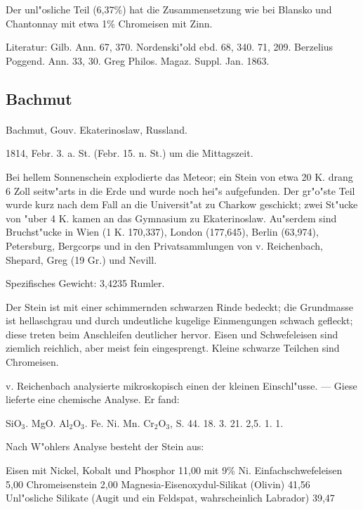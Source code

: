 \documentclass[a4paper, 11pt, oneside]{article}
\begin{document}
Der unl"osliche Teil (6,37\%) hat die Zusammensetzung wie bei Blansko und Chantonnay mit etwa 1\% Chromeisen mit Zinn.

Literatur: Gilb. Ann. 67, 370. Nordenski"old ebd. 68, 340. 71, 209. Berzelius Poggend. Ann. 33, 30. Greg Philos. Magaz. Suppl. Jan. 1863.

\subsection{Bachmut}
\normalsize
\paragraph{}
Bachmut, Gouv. Ekaterinoslaw, Russland.

1814, Febr. 3. a. St. (Febr. 15. n. St.) um die Mittagszeit.

Bei hellem Sonnenschein explodierte das Meteor; ein Stein von etwa 20 K. drang 6 Zoll seitw"arts in die Erde und wurde noch hei"s aufgefunden. Der gr"o"ste Teil wurde kurz nach dem Fall an die Universit"at zu Charkow geschickt; zwei St"ucke von "uber 4 K. kamen an das Gymnasium zu Ekaterinoslaw. Au"serdem sind Bruchst"ucke in Wien (1 K. 170,337), London (177,645), Berlin (63,974), Petersburg, Bergcorps und in den Privatsammlungen von v. Reichenbach, Shepard, Greg (19 Gr.) und Nevill.

Spezifisches Gewicht: 3,4235 Rumler.

Der Stein ist mit einer schimmernden schwarzen Rinde bedeckt; die Grundmasse ist hellaschgrau und durch undeutliche kugelige Einmengungen schwach gefleckt; diese treten beim Anschleifen deutlicher hervor. Eisen und Schwefeleisen sind ziemlich reichlich, aber meist fein eingesprengt. Kleine schwarze Teilchen sind Chromeisen.

v. Reichenbach analysierte mikroskopisch einen der kleinen Einschl"usse. --- Giese lieferte eine chemische Analyse. Er fand:

SiO$_{3}$. MgO. Al$_{2}$O$_{3}$. Fe. Ni. Mn. Cr$_{2}$O$_{3}$, S.  
44. 18. 3. 21. 2,5. 1. 1.

Nach W"ohlers Analyse besteht der Stein aus:

Eisen mit Nickel, Kobalt und Phosphor 11,00 mit 9\% Ni.  
Einfachschwefeleisen 5,00  
Chromeisenstein 2,00  
Magnesia-Eisenoxydul-Silikat (Olivin) 41,56  
Unl"osliche Silikate (Augit und ein Feldspat, wahrscheinlich Labrador) 39,47
\end{document}
